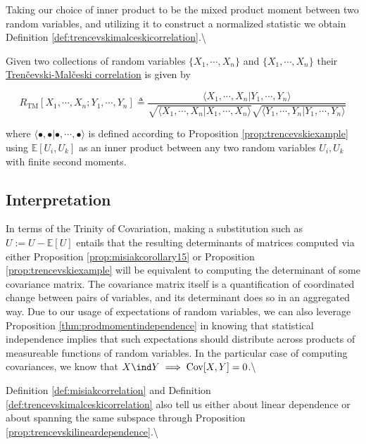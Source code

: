 \documentclass[
  letterpaper,
  DIV=11,
  numbers=noendperiod]{scrreprt}
\begin{document}
Taking our choice of inner product to be the mixed product moment
between two random variables, and utilizing it to construct a normalized
statistic we obtain Definition
\ref{def:trencevskimalceskicorrelation}.\textbackslash{}

\begin{Definition}[mydefinition=Tren\v cevski-Mal\v ceski Correlation Coefficient, label=def:trencevskimalceskicorrelation]
Given two collections of random variables $\{ X_1, \cdots, X_n \}$ and $\{ X_1, \cdots, X_n \}$ their \underline{Tren\v cevski-Mal\v ceski correlation} is given by

$$R_{\text{TM}}[X_1, \cdots, X_n; Y_1, \cdots, Y_n] \triangleq \frac{\langle X_1, \cdots, X_n | Y_1, \cdots, Y_n \rangle}{\sqrt{\langle X_1, \cdots, X_n | X_1, \cdots, X_n \rangle} \sqrt{\langle Y_1, \cdots, Y_n | Y_1, \cdots, Y_n \rangle} }$$

where $\langle \bullet, \bullet | \bullet, \cdots, \bullet \rangle$ is defined according to Proposition \ref{prop:trencevskiexample} using $\mathbb{E}[U_i, U_k]$ as an inner product between any two random variables $U_i, U_k$ with finite second moments.
\end{Definition}

\subsection{Interpretation}\label{interpretation-2}

In terms of the Trinity of Covariation, making a substitution such as
\(U := U - \mathbb{E}[U]\) entails that the resulting determinants of
matrices computed via either Proposition \ref{prop:misiakcorollary15} or
Proposition \ref{prop:trencevskiexample} will be equivalent to computing
the determinant of some covariance matrix. The covariance matrix itself
is a quantification of coordinated change between pairs of variables,
and its determinant does so in an aggregated way. Due to our usage of
expectations of random variables, we can also leverage Proposition
\ref{thm:prodmomentindependence} in knowing that statistical
independence implies that such expectations should distribute across
products of measureable functions of random variables. In the particular
case of computing covariances, we know that
\(X \ind Y \implies \operatorname{Cov}[X,Y] = 0\).\textbackslash{}

Definition \ref{def:misiakcorrelation} and Definition
\ref{def:trencevskimalceskicorrelation} also tell us either about linear
dependence or about spanning the same subspace through Proposition
\ref{prop:trencevskilineardependence}.\textbackslash{}
\end{document}
